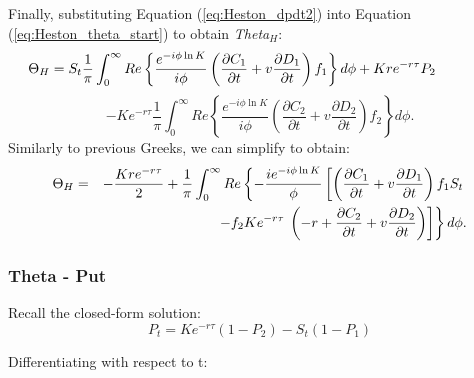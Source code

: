 \documentclass[a4paper]{article}
\begin{document}
Finally, substituting Equation (\ref{eq:Heston_dpdt2}) into Equation (\ref{eq:Heston_theta_start}) to obtain \textit{Theta$_H$}:
\begin{equation*}
	\hspace{-40pt} \Theta_H = S_t \frac{1}{\pi}\int_0^{\infty} Re \left\{ \frac{e^{-i\phi \ln K}}{i\phi} \left( \frac{\partial C_1}{\partial t} + v\frac{\partial D_1}{\partial t} \right) f_1 \right\} d\phi + Kre^{-r\tau}P_2
\end{equation*}
\begin{equation}
	- Ke^{-r\tau} \frac{1}{\pi}\int_0^{\infty} Re \left\{ \frac{e^{-i\phi \ln K}}{i\phi} \left( \frac{\partial C_2}{\partial t} + v\frac{\partial D_2}{\partial t} \right) f_2 \right\} d\phi.
\end{equation}
Similarly to previous Greeks, we can simplify to obtain:
\begin{eqnarray}
	\Theta_H &  = & -\frac{Kre^{-r\tau}}{2} +\frac{1}{\pi} \int_0^\infty Re \left\{-\frac{ie^{-i\phi \ln K}}{\phi} \left[ \left( \frac{\partial C_1}{\partial t} + v\frac{\partial D_1}{\partial t} \right ) f_1S_t\right. \right. \notag\\
	&  & - f_2Ke^{-r\tau}\left. \left.  \left(-r + \frac{\partial C_2}{\partial t} + v\frac{\partial D_2}{\partial t} \right ) \right] \right\} d\phi.
\end{eqnarray}




\newpage




\subsubsection*{Theta - Put}

Recall the closed-form solution:
\begin{equation}
	P_t  = Ke^{-r\tau}(1-P_2) -  S_t(1-P_1)
\end{equation}

Differentiating with respect to t:
\end{document}
